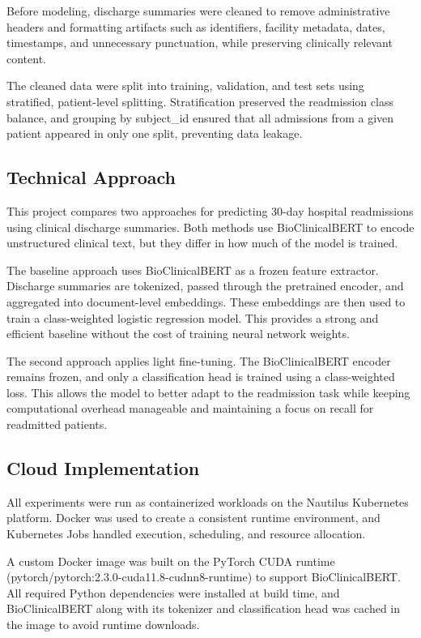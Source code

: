 \documentclass[11pt]{article}
\begin{document}
Before modeling, discharge summaries were cleaned to remove administrative headers and formatting artifacts such as identifiers, facility metadata, dates, timestamps, and unnecessary punctuation, while preserving clinically relevant content.

The cleaned data were split into training, validation, and test sets using stratified, patient-level splitting. Stratification preserved the readmission class balance, and grouping by subject\_id ensured that all admissions from a given patient appeared in only one split, preventing data leakage.

\subsection{Technical Approach}

This project compares two approaches for predicting 30-day hospital readmissions using clinical discharge summaries. Both methods use BioClinicalBERT to encode unstructured clinical text, but they differ in how much of the model is trained.

The baseline approach uses BioClinicalBERT as a frozen feature extractor. Discharge summaries are tokenized, passed through the pretrained encoder, and aggregated into document-level embeddings. These embeddings are then used to train a class-weighted logistic regression model. This provides a strong and efficient baseline without the cost of training neural network weights.

The second approach applies light fine-tuning. The BioClinicalBERT encoder remains frozen, and only a classification head is trained using a class-weighted loss. This allows the model to better adapt to the readmission task while keeping computational overhead manageable and maintaining a focus on recall for readmitted patients.

\subsection{Cloud Implementation}

All experiments were run as containerized workloads on the Nautilus Kubernetes platform. Docker was used to create a consistent runtime environment, and Kubernetes Jobs handled execution, scheduling, and resource allocation.

A custom Docker image was built on the PyTorch CUDA runtime (pytorch/pytorch:2.3.0-cuda11.8-cudnn8-runtime) to support BioClinicalBERT. All required Python dependencies were installed at build time, and BioClinicalBERT along with its tokenizer and classification head was cached in the image to avoid runtime downloads.
\end{document}
